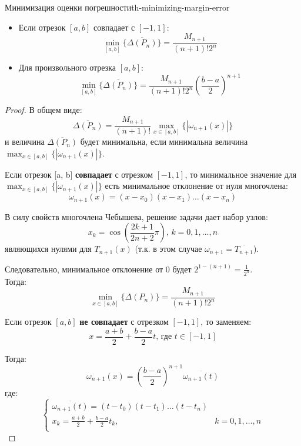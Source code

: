 \documentclass[14pt]{extarticle}
\begin{document}
    \clearpage
    \begin{theorem}{Минимизация оценки погрешности}{th-minimizing-margin-error}
        \begin{itemize}
            \item Если отрезок $[a, b]$ совпадает с $[-1, 1]$:
                  $$\min_{[a, b]}\{\overline{\Delta(P_{n})}\} = \frac{M_{n + 1}}{(n + 1)! 2^{n}}$$
            \item Для произвольного отрезка $[a, b]$:
                  $$\min_{[a, b]}\{\overline{\Delta(P_{n})}\} = \frac{M_{n + 1}}{(n + 1)! 2^{n}}(\frac{b - a}{2})^{n + 1}$$
        \end{itemize}

        \begin{proof}
            В общем виде:
            $$\overline{\Delta(P_{n})} = \frac{M_{n + 1}}{(n + 1)!} \max_{x \in [a, b]} \{|\omega_{n + 1}(x)|\}$$
            и величина $\overline{\Delta(P_{n})}$ будет минимальна, если минимальна величина $\max_{x \in [a, b]} \{|\omega_{n + 1}(x)|\}$.

            \vspace{\baselineskip}

            Если отрезок [a, b] \textbf{совпадает} с отрезком $[-1, 1]$, то минимальное значение для $\max_{x \in [a, b]} \{|\omega_{n + 1}(x)|\}$ есть минимальное отклонение от нуля многочлена:
            $$\omega_{n + 1}(x) = (x - x_{0})(x - x_{1}) \ldots (x - x_{n})$$
        
            В силу свойств многочлена Чебышева, решение задачи дает набор узлов:
            $$x_{k} = \cos(\frac{2k + 1}{2n + 2}\pi) \text{, } k = 0, 1, \ldots, n$$
            являющихся нулями для $T_{n + 1}(x)$ (т.к. в этом случае $\omega_{n+1} = \overline{T_{n + 1}}$).

            \vspace{\baselineskip}

            Следовательно, минимальное отклонение от $0$ будет $2^{1 - (n + 1)} = \frac{1}{2^{n}}$.\\
            Тогда: $$\min_{x \in [a, b]}\{\Delta(P_{n})\} = \frac{M_{n + 1}}{(n+1)! 2^{n}}$$

            \vspace{\baselineskip}

            Если отрезок $[a, b]$ \textbf{не совпадает} с отрезком $[-1, 1]$, то заменяем:
            $$x = \frac{a + b}{2} + \frac{b - a}{2}t \text{, где } t \in [-1, 1]$$

            Тогда:
            $$\omega_{n + 1}(x) = (\frac{b - a}{2})^{n + 1}\overline{\omega_{n + 1}(t)}$$
            где: 
            $$
            \begin{cases}
                \overline{\omega_{n + 1}(t)} = (t - t_{0})(t - t_{1}) \ldots (t - t_{n})\\
                x_{k} = \frac{a + b}{2} + \frac{b - a}{2}t_{k}, & k = 0, 1, \ldots, n \\
            \end{cases}
            $$


\end{proof}
\end{theorem}
\end{document}

